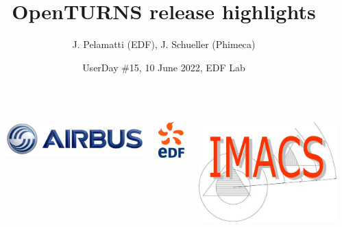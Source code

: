 \documentclass[aspectratio=169]{beamer}
\title[OpenTURNS]{OpenTURNS release highlights}
\author[OpenTURNS et al.]{J. Pelamatti (EDF), J. Schueller (Phimeca)}
\date[]{UserDay \#15, 10 June 2022, EDF Lab}
\begin{document}

  \begin{frame}
  \titlepage

  \begin{columns}
  \begin{column}[t]{0.05\textwidth}
        \end{column}
  
  \begin{center}
\includegraphics[height=0.04\textheight]{figures/airbus-logo-3d-blue.png}
\end{center}

  \begin{center}
\includegraphics[height=0.09\textheight]{figures/logo-edf.jpg}
\end{center}

  \begin{center}
\includegraphics[height=0.09\textheight]{figures/imacs-logo.jpg}
\end{center}


\end{columns}
\end{frame}
\end{document}
